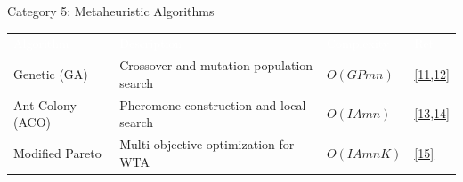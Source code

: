 \documentclass[aspectratio=169,10pt]{beamer}
\begin{document}
\begin{frame}{Category 5: Metaheuristic Algorithms}


  \vspace{0.4cm}
  \begin{center}
  \small
  \begin{tabular}{lp{4.5cm}lp{1cm}}
    \rowcolor{DarkSlate}
    \textcolor{white}{Algorithm} & \textcolor{white}{Description} & \textcolor{white}{Complexity} & \textcolor{white}{Ref} \\
    Genetic (GA) & Crossover and mutation population search & $O(GPmn)$ & \hyperlink{ref11}{[11,12]} \\
    Ant Colony (ACO) & Pheromone construction and local search & $O(IAmn)$ & \hyperlink{ref13}{[13,14]} \\
    Modified Pareto & Multi-objective optimization for WTA & $O(IAmnK)$ & \hyperlink{ref15}{[15]} \\
  \end{tabular}
  \end{center}
\end{frame}
\end{document}
